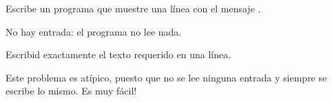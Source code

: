 
\Statement

Escribe un programa que muestre una línea con el mensaje .

\Input

No hay entrada: el programa no lee nada.

\Output

Escribid exactamente el texto requerido en una línea.

\Sample

\Observation

Este problema es atípico, puesto que no se lee ninguna entrada y siempre se escribe lo mismo.
Es muy fácil!
